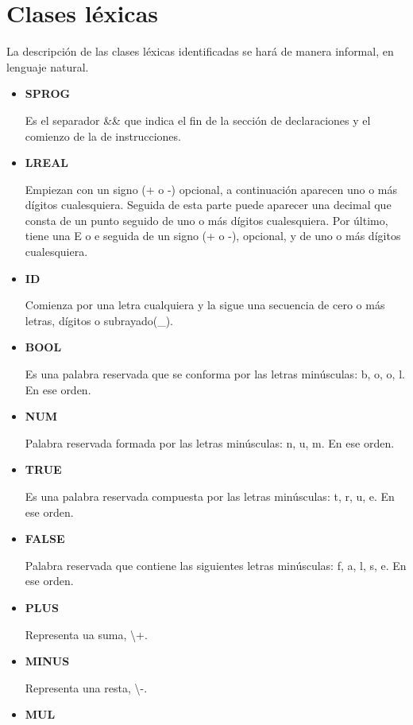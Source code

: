 \documentclass[\main/MemoriaPL.tex]{subfiles}
\begin{document}
  \section{Clases léxicas} \label{lexicon}
    \par
    La descripción de las clases léxicas identificadas se hará de manera informal, en lenguaje natural.

    \begin{itemize}
      \item \textbf{SPROG}
        \par
        Es el separador \&\& que indica el fin de la sección de declaraciones y el comienzo de la de instrucciones.
      \item \textbf{LREAL}
        \par
        Empiezan con un signo (+ o -) opcional, a continuación aparecen uno o más dígitos cualesquiera.
        Seguida de esta parte puede aparecer una decimal que consta de un punto seguido de uno o más dígitos cualesquiera.
        Por último, tiene una E o e seguida de un signo (+ o -), opcional, y de uno o más dígitos cualesquiera.
      \item \textbf{ID}
        \par
        Comienza por una letra cualquiera y la sigue una secuencia de cero o más letras, dígitos o subrayado(\_).
      \item \textbf{BOOL}
        \par
        Es una palabra reservada que se conforma por las letras minúsculas: b, o, o, l. En ese orden.
      \item \textbf{NUM}
        \par
        Palabra reservada formada por las letras minúsculas: n, u, m. En ese orden.
      \item \textbf{TRUE}
        \par
        Es una palabra reservada compuesta por las letras minúsculas: t, r, u, e. En ese orden.
      \item \textbf{FALSE}
        \par
        Palabra reservada que contiene las siguientes letras minúsculas: f, a, l, s, e. En ese orden.
      \item \textbf{PLUS}
        \par
        Representa ua suma, \textbackslash +.
      \item \textbf{MINUS}
        \par
        Representa una resta, \textbackslash -.
      \item \textbf{MUL}

\end{itemize}
\end{document}
